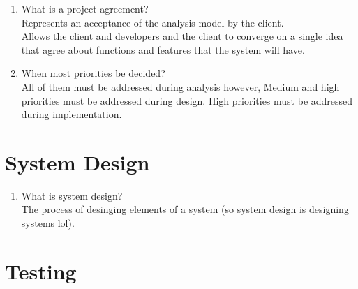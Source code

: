 \documentclass[10pt]{article}
\begin{document}
\begin{enumerate}
      \item What is a project agreement?\\
            Represents an acceptance of the analysis model by the client.\\
            Allows the client and developers and the client to converge on a single idea that agree about functions and features that the system will have.\\

      \item When most priorities be decided?\\
            All of them must be addressed during analysis however,
            Medium and high priorities must be addressed during design.
            High priorities must be addressed during implementation.\\
\end{enumerate}
\section{System Design}
\begin{enumerate}
      \item What is system design?\\
            The process of desinging elements of a system (so system design is designing systems lol).\\


\end{enumerate}

\section{Testing}
\end{document}
